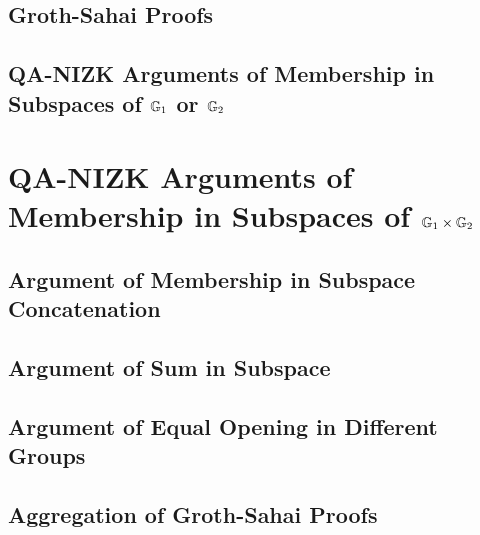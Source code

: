         

    \section{Groth-Sahai Proofs}\label{sec:gs-proofs}

        

    \section{QA-NIZK Arguments of Membership in Subspaces of $\mathbb{G}_1$ or $\mathbb{G}_2$} \label{sect:QANIZKlinspace}

        

    
\chapter{QA-NIZK Arguments of Membership in Subspaces of $\mathbb{G}_1\times\mathbb{G}_2$}\label{sec:agg-asym}
    
    

    \section{Argument of Membership in Subspace Concatenation}\label{sec:concat}

        

    \section{Argument of Sum in Subspace}\label{sec:sum}
        
        

    \section{Argument of Equal Opening in Different Groups} \label{sec:aggcommit}

         

    \section{Aggregation of Groth-Sahai Proofs}\label{sec:agg-gs}

        

